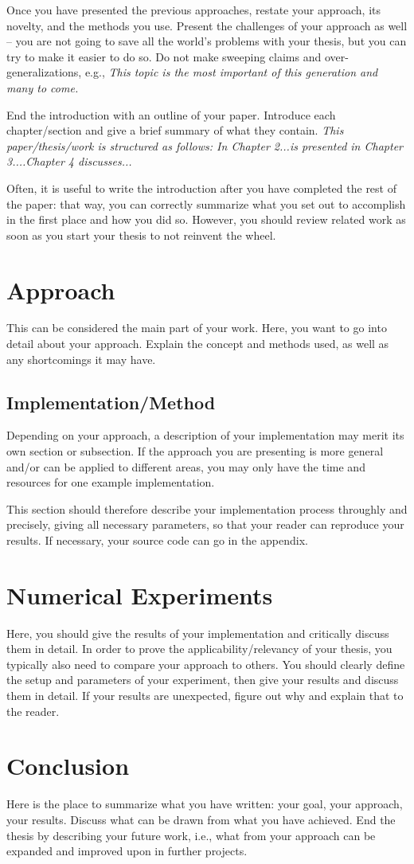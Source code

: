 Once you have presented the previous approaches, restate your approach, its novelty, and the methods you use. Present the challenges of your approach as well -- you are not going to save all the world's problems with your thesis, but you can try to make it easier to do so. Do not make sweeping claims and over-generalizations, e.g., \textit{This topic is the most important of this generation and many to come.}

End the introduction with an outline of your paper. Introduce each chapter/section and give a brief summary of what they contain. \textit{This paper/thesis/work is structured as follows: In Chapter 2...is presented in Chapter 3....Chapter 4 discusses...}

Often, it is useful to write the introduction after you have completed the rest of the paper: that way, you can correctly summarize what you set out to accomplish in the first place and how you did so. However, you should review related work as soon as you start your thesis to not reinvent the wheel.


\section{Approach}
This can be considered the main part of your work. Here, you want to go into detail about your approach. Explain the concept and methods used, as well as any shortcomings it may have. 

\subsection{Implementation/Method}
Depending on your approach, a description of your implementation may merit its own section or subsection. If the approach you are presenting is more general and/or can be applied to different areas, you may only have the time and resources for one example implementation.

This section should therefore describe your implementation process throughly and precisely, giving all necessary parameters, so that your reader can reproduce your results. If necessary, your source code can go in the appendix. 


\section{Numerical Experiments}
Here, you should give the results of your implementation and critically discuss them in detail. In order to prove the applicability/relevancy of your thesis, you typically also need to compare your approach to others. You should clearly define the setup and parameters of your experiment, then give your results and discuss them in detail. If your results are unexpected, figure out why and explain that to the reader. 


\section{Conclusion}
Here is the place to summarize what you have written: your goal, your approach, your results. Discuss what can be drawn from what you have achieved. End the thesis by describing your future work, i.e., what from your approach can be expanded and improved upon in further projects.